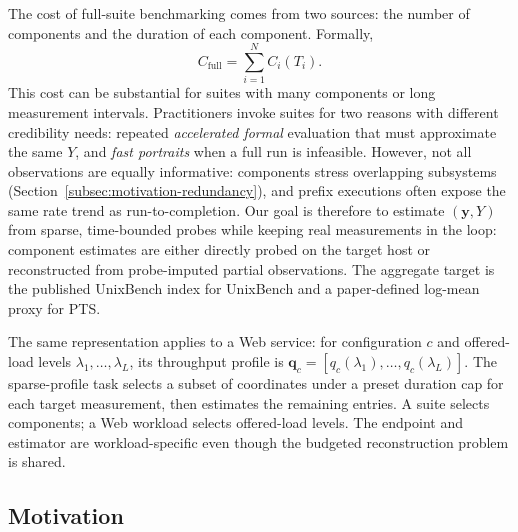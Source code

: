 \documentclass[sigconf, review, anonymous, balance=false]{acmart}
\begin{document}
The cost of full-suite benchmarking comes from two sources: the number of components and the duration of each component. Formally,
\begin{equation}
\label{eq:full-cost}
C_{\mathrm{full}}=\sum_{i=1}^{N}C_i(T_i).
\end{equation}
This cost can be substantial for suites with many components or long measurement intervals.
Practitioners invoke suites for two reasons with different credibility needs: repeated \emph{accelerated formal} evaluation that must approximate the same $Y$, and \emph{fast portraits} when a full run is infeasible.
However, not all observations are equally informative: components stress overlapping subsystems (Section~\ref{subsec:motivation-redundancy}), and prefix executions often expose the same rate trend as run-to-completion.
Our goal is therefore to estimate $(\mathbf{y},Y)$ from sparse, time-bounded probes while keeping real measurements in the loop: component estimates are either directly probed on the target host or reconstructed from probe-imputed partial observations. The aggregate target is the published UnixBench index for UnixBench and a paper-defined log-mean proxy for PTS.

The same representation applies to a Web service: for configuration $c$ and offered-load levels $\lambda_1,\ldots,\lambda_L$, its throughput profile is $\mathbf{q}_c=[q_c(\lambda_1),\ldots,q_c(\lambda_L)]$. The sparse-profile task selects a subset of coordinates under a preset duration cap for each target measurement, then estimates the remaining entries. A suite selects components; a Web workload selects offered-load levels. The endpoint and estimator are workload-specific even though the budgeted reconstruction problem is shared.


\subsection{Motivation}
\end{document}
